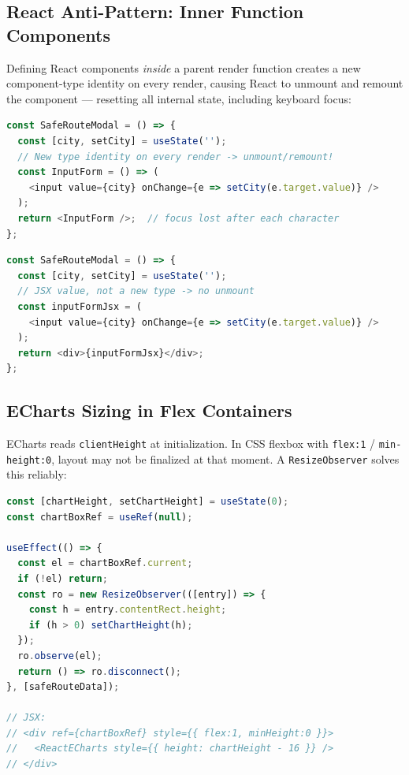 \documentclass[12pt,a4paper]{article}
\begin{document}
\subsection{React Anti-Pattern: Inner Function Components}

Defining React components \emph{inside} a parent render function creates a new
component-type identity on every render, causing React to unmount and remount the
component --- resetting all internal state, including keyboard focus:

\begin{lstlisting}[style=tscode, language=JavaScript,
  caption={Incorrect: inner function component loses focus after every keystroke}]
const SafeRouteModal = () => {
  const [city, setCity] = useState('');
  // New type identity on every render -> unmount/remount!
  const InputForm = () => (
    <input value={city} onChange={e => setCity(e.target.value)} />
  );
  return <InputForm />;  // focus lost after each character
};
\end{lstlisting}

\begin{lstlisting}[style=tscode, language=JavaScript,
  caption={Correct: JSX variable; stable identity; focus retained}]
const SafeRouteModal = () => {
  const [city, setCity] = useState('');
  // JSX value, not a new type -> no unmount
  const inputFormJsx = (
    <input value={city} onChange={e => setCity(e.target.value)} />
  );
  return <div>{inputFormJsx}</div>;
};
\end{lstlisting}

\subsection{ECharts Sizing in Flex Containers}

ECharts reads \texttt{clientHeight} at initialization. In CSS flexbox with
\texttt{flex:1} / \texttt{min-height:0}, layout may not be finalized at that
moment. A \texttt{ResizeObserver} solves this reliably:

\begin{lstlisting}[style=tscode, language=JavaScript,
  caption={ResizeObserver for reliable ECharts height}]
const [chartHeight, setChartHeight] = useState(0);
const chartBoxRef = useRef(null);

useEffect(() => {
  const el = chartBoxRef.current;
  if (!el) return;
  const ro = new ResizeObserver(([entry]) => {
    const h = entry.contentRect.height;
    if (h > 0) setChartHeight(h);
  });
  ro.observe(el);
  return () => ro.disconnect();
}, [safeRouteData]);

// JSX:
// <div ref={chartBoxRef} style={{ flex:1, minHeight:0 }}>
//   <ReactECharts style={{ height: chartHeight - 16 }} />
// </div>
\end{lstlisting}
\end{document}
